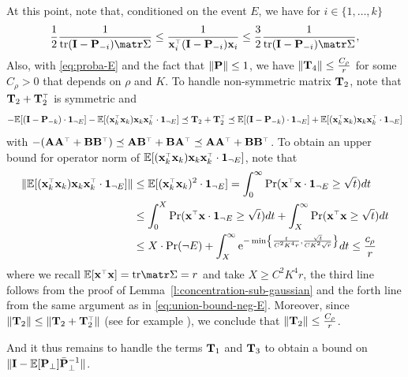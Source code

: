 \documentclass[../../thesis.tex]{subfiles}
\begin{document}
\medskip

At this point, note that, conditioned on the event $E$, we have for $i \in \{1, \ldots, k \}$
\begin{equation}
  \frac12 \frac1{\tr (\I - \P_{-i}) \Sigmab} \le \frac1{\x_i^\top (\I - \P_{-i}) \x_i} \le \frac32 \frac1{\tr (\I - \P_{-i}) \Sigmab}, %
\end{equation}
Also, with \eqref{eq:proba-E} and the fact that $\| \P \| \le 1$, we have $ \| \T_4 \| \le
  \frac{C_\rho}{r}$ for some $C_\rho > 0$ that depends on $\rho$ and $K$. To handle non-symmetric matrix $\T_2$, note that $\T_2 + \T_2^\top$ is symmetric and
\begin{equation}
  - \E[ (\I - \P_{-k}) \cdot \one_{\neg E}] - \E[ (\x_k^\top \x_k) \x_k\x_k^\top \cdot \one_{\neg E}] \preceq \T_2 + \T_2^\top \preceq \E[ (\I - \P_{-k}) \cdot \one_{\neg E}] + \E[ (\x_k^\top \x_k) \x_k\x_k^\top \cdot \one_{\neg E}]
\end{equation}
with $-(\A \A^\top + \B \B^\top) \preceq \A \B^\top + \B \A^\top \preceq \A \A^\top + \B \B^\top$. To obtain an upper bound for operator norm of $\E[ (\x_k^\top \x_k) \x_k\x_k^\top \cdot \one_{\neg E}]$, note that
\begin{align*}
  \| \E[ (\x_k^\top \x_k) \x_k\x_k^\top \cdot \one_{\neg E}] \| & \le \E[ (\x_k^\top \x_k)^2 \cdot \one_{\neg E}] = \int_0^\infty \Pr ( \x^\top \x \cdot \one_{\neg E} \ge \sqrt t ) dt                          \\
                                                                & \le \int_0^X \Pr ( \x^\top \x \cdot \one_{\neg E} \ge \sqrt t ) dt + \int_X^\infty \Pr ( \x^\top \x \ge \sqrt t ) dt                           \\
                                                                & \le X \cdot \Pr(\neg E) + \int_X^\infty \ee^{- \min \left\{ \frac{t}{C^2 K^4 r}, \frac{\sqrt t}{CK^2 \sqrt r} \right\} } dt \le \frac{c_\rho}r
\end{align*}
where we recall $\E[\x^\top \x] = \tr \Sigmab = r$ and take $X \ge C^2 K^4 r$, the third line follows from the proof of Lemma~\ref{l:concentration-sub-gaussian} and the forth line from the same argument as in \eqref{eq:union-bound-neg-E}. Moreover, since $\| \T_2 \| \le \| \T_2 + \T_2^\top \|$ (see for example \cite[Proposition~5.11]{serre2010matrices}), we conclude that $\| \T_2 \| \le \frac{C_\rho}r$.


And it thus remains to handle the terms $\T_1$ and $\T_3$ to obtain a bound on $\| \I - \E[\P_\perp] \bar \P_\perp^{-1} \| $.
\end{document}
